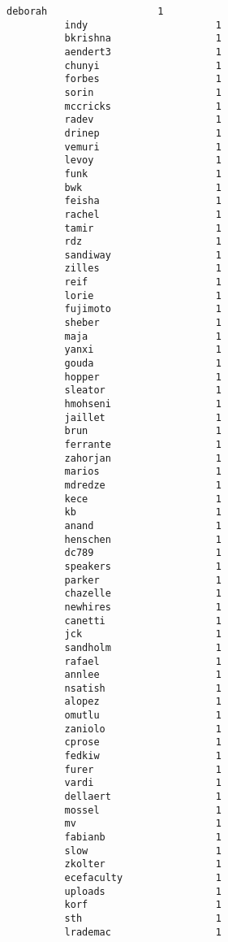 \documentclass[11pt]{article}
\begin{document}
\begin{Verbatim}[commandchars=\\\{\}]
          deborah                   1
          indy                      1
          bkrishna                  1
          aendert3                  1
          chunyi                    1
          forbes                    1
          sorin                     1
          mccricks                  1
          radev                     1
          drinep                    1
          vemuri                    1
          levoy                     1
          funk                      1
          bwk                       1
          feisha                    1
          rachel                    1
          tamir                     1
          rdz                       1
          sandiway                  1
          zilles                    1
          reif                      1
          lorie                     1
          fujimoto                  1
          sheber                    1
          maja                      1
          yanxi                     1
          gouda                     1
          hopper                    1
          sleator                   1
          hmohseni                  1
          jaillet                   1
          brun                      1
          ferrante                  1
          zahorjan                  1
          marios                    1
          mdredze                   1
          kece                      1
          kb                        1
          anand                     1
          henschen                  1
          dc789                     1
          speakers                  1
          parker                    1
          chazelle                  1
          newhires                  1
          canetti                   1
          jck                       1
          sandholm                  1
          rafael                    1
          annlee                    1
          nsatish                   1
          alopez                    1
          omutlu                    1
          zaniolo                   1
          cprose                    1
          fedkiw                    1
          furer                     1
          vardi                     1
          dellaert                  1
          mossel                    1
          mv                        1
          fabianb                   1
          slow                      1
          zkolter                   1
          ecefaculty                1
          uploads                   1
          korf                      1
          sth                       1
          lrademac                  1

\end{Verbatim}
\end{document}
